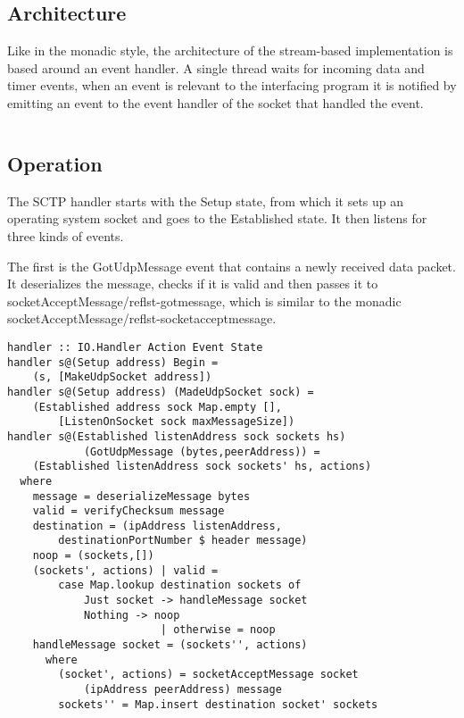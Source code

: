 \subsection{Architecture}
Like in the monadic style, the architecture of the stream-based implementation is based around an event handler. A single thread waits for incoming data and timer events, when an event is relevant to the interfacing program it is notified by emitting an event to the event handler of the socket that handled the event.
\begin{lstlisting}[caption={The payload handler}]
\end{lstlisting}

\subsection{Operation}
The SCTP handler starts with the Setup state, from which it sets up an operating system socket and goes to the Established state. It then listens for three kinds of events.

The first is the GotUdpMessage event that contains a newly received data packet. It deserializes the message, checks if it is valid and then passes it to socketAcceptMessage/ref{lst-gotmessage}, which is similar to the monadic socketAcceptMessage/ref{lst-socketacceptmessage}.

\begin{lstlisting}[caption={The GotUdpMessage event handler},label={lst-gotmessage}]
handler :: IO.Handler Action Event State
handler s@(Setup address) Begin =
    (s, [MakeUdpSocket address])
handler s@(Setup address) (MadeUdpSocket sock) =
    (Established address sock Map.empty [],
        [ListenOnSocket sock maxMessageSize])
handler s@(Established listenAddress sock sockets hs)
            (GotUdpMessage (bytes,peerAddress)) =
    (Established listenAddress sock sockets' hs, actions)
  where
    message = deserializeMessage bytes
    valid = verifyChecksum message
    destination = (ipAddress listenAddress,
        destinationPortNumber $ header message)
    noop = (sockets,[])
    (sockets', actions) | valid =
        case Map.lookup destination sockets of
            Just socket -> handleMessage socket
            Nothing -> noop
                        | otherwise = noop
    handleMessage socket = (sockets'', actions)
      where
        (socket', actions) = socketAcceptMessage socket
            (ipAddress peerAddress) message
        sockets'' = Map.insert destination socket' sockets
\end{lstlisting}

